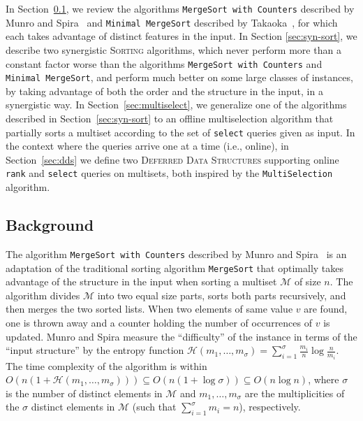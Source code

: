 In Section~\ref{sec:back}, we review the algorithms \texttt{MergeSort
  with Counters} described by Munro and
Spira~\cite{1976-JComp-SortingAndSearchingInMultisets-MunroSpira} and
\texttt{Minimal MergeSort} described by
Takaoka~\cite{2009-Chapter-PartialSolutionAndEntropy-Takaoka}, for
which each takes advantage of distinct features in the input. In
Section \ref{sec:syn-sort}, we describe two synergistic
\textsc{Sorting} algorithms, which never perform more than a constant
factor worse than the algorithms \texttt{MergeSort with Counters} and
\texttt{Minimal MergeSort}, and perform much better on some large
classes of instances, by taking advantage of both the order and the
structure in the input, in a synergistic way. In
Section~\ref{sec:multiselect}, we generalize one of the algorithms
described in Section~\ref{sec:syn-sort} to an offline multiselection
algorithm that partially sorts a multiset according to the set of
\texttt{select} queries given as input. In the context where the
queries arrive one at a time (i.e., online), in
Section~\ref{sec:dds} we define two \textsc{Deferred Data Structures}
supporting online \texttt{rank} and \texttt{select} queries on
multisets, both inspired by the \texttt{MultiSelection} algorithm.

\subsection{Background}
\label{sec:back}

The algorithm \texttt{MergeSort with Counters} described by Munro and
Spira~\cite{1976-JComp-SortingAndSearchingInMultisets-MunroSpira} is
an adaptation of the traditional sorting algorithm \texttt{MergeSort}
that optimally takes advantage of the structure in the input when
sorting a multiset $\mathcal{M}$ of size $n$. The algorithm divides
$\mathcal{M}$ into two equal size parts, sorts both parts recursively,
and then merges the two sorted lists. When two elements of same value $v$ are
found, one is thrown away and a counter holding the number of occurrences
of $v$ is updated. Munro and Spira measure the
``difficulty'' of the instance in terms of the ``input structure'' by
the entropy function
$\mathcal{H}(m_1, \dots, m_\sigma) =
\sum_{i=1}^\sigma{\frac{m_i}{n}}\log{\frac{n}{m_i}}$.  The time
complexity of the algorithm is within
$O(n(1 + \mathcal{H}(m_1, \dots, m_\sigma))) \subseteq
O(n(1{+}\log{\sigma})) \subseteq O(n\log{n})$, where $\sigma$ is the
number of distinct elements in $\mathcal{M}$ and
$m_1, \dots, m_\sigma$ are the multiplicities of the $\sigma$ distinct
elements in $\mathcal{M}$ (such that $\sum_{i=1}^\sigma {m_i}=n$),
respectively.


